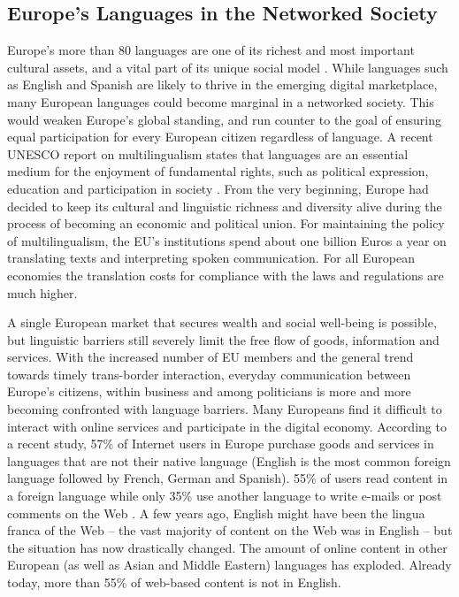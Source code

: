 \documentclass[10pt, plain]{../../metanetpaper}
\begin{document}
\begin{multicols}{2}

\subsection{Europe's Languages in the Networked Society}
\label{sec:status-europes-languages}

Europe’s more than 80 languages are one of its richest and most important cultural assets, and a vital part of its unique social model \cite{EC2}. While languages such as English and Spanish are likely to thrive in the emerging digital marketplace, many European languages could become marginal in a networked society. This would weaken Europe’s global standing, and run counter to the goal of ensuring equal participation for every European citizen regardless of language. A recent UNESCO report on multilingualism states that languages are an essential medium for the enjoyment of fundamental rights, such as political expression, education and participation in society \cite{Unesco1}. From the very beginning, Europe had decided to keep its cultural and linguistic richness and diversity alive during the process of becoming an economic and political union. For maintaining the policy of multilingualism, the EU’s institutions spend about one billion Euros a year on translating texts and interpreting spoken communication. For all European economies the translation costs for compliance with the laws and regulations are much higher.

A single European market that secures wealth and social well-being is possible, but linguistic barriers still severely limit the free flow of goods, information and services. With the increased number of EU members and the general trend towards timely trans-border interaction, everyday communication between Europe’s citizens, within business and among politicians is more and more becoming confronted with language barriers. Many Europeans find it difficult to interact with online services and participate in the digital economy. According to a recent study, 57\% of Internet users in Europe purchase goods and services in languages that are not their native language (English is the most common foreign language followed by French, German and Spanish). 55\% of users read content in a foreign language while only 35\% use another language to write e-mails or post comments on the Web \cite{EC1}. A few years ago, English might have been the lingua franca of the Web -- the vast majority of content on the Web was in English -- but the situation has now drastically changed. The amount of online content in other European (as well as Asian and Middle Eastern) languages has exploded. Already today, more than 55\% of web-based content is not in English.


\end{multicols}
\end{document}
